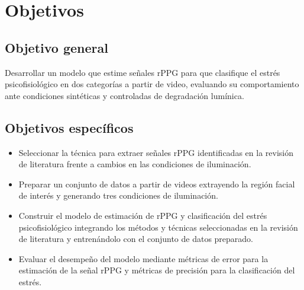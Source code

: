\chapter{Objetivos}
\section{Objetivo general}

Desarrollar un modelo que estime señales rPPG para que clasifique el estrés psicofisiológico en dos 
categorías a partir de video, evaluando su comportamiento ante condiciones sintéticas y 
controladas de degradación lumínica.

\vspace{0.5cm}
\section{Objetivos específicos}
\begin{itemize}

    \item Seleccionar la técnica para extraer señales rPPG identificadas en la revisión 
    de literatura frente a cambios en las condiciones de iluminación.


    \item Preparar un conjunto de datos a partir de videos
    extrayendo la región facial de interés y generando tres 
    condiciones de iluminación.

    \item Construir el modelo de estimación de rPPG y clasificación del estrés psicofisiológico 
     integrando los métodos y técnicas seleccionadas en la revisión de literatura y 
    entrenándolo con el conjunto de datos preparado.

    \item Evaluar el desempeño del modelo mediante métricas de error para la estimación de la 
    señal rPPG y métricas de precisión para la clasificación del estrés.

\end{itemize}